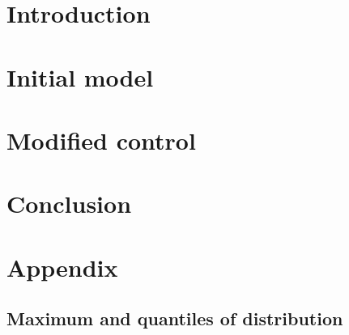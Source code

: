 \documentclass[a4paper, 11pt]{report}
\begin{document}
\setcounter{tocdepth}{4} %
\setcounter{secnumdepth}{3} %
\tableofcontents


\chapter{Introduction}


\chapter{Initial model}



\chapter{Modified control}


\chapter*{Conclusion}



\appendix
\chapter*{Appendix}
\setcounter{chapter}{1}


\section{Maximum and quantiles of distribution}

\end{document}
